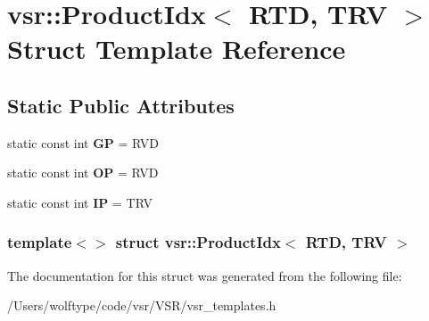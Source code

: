 \hypertarget{structvsr_1_1_product_idx_3_01_r_t_d_00_01_t_r_v_01_4}{\section{vsr\-:\-:Product\-Idx$<$ R\-T\-D, T\-R\-V $>$ Struct Template Reference}
\label{structvsr_1_1_product_idx_3_01_r_t_d_00_01_t_r_v_01_4}
}
\subsection*{Static Public Attributes}
\begin{DoxyCompactItemize}
\item 
\hypertarget{structvsr_1_1_product_idx_3_01_r_t_d_00_01_t_r_v_01_4_a17ffcf43bcd64127cebbb932d508058c}{static const int {\bfseries G\-P} = R\-V\-D}\label{structvsr_1_1_product_idx_3_01_r_t_d_00_01_t_r_v_01_4_a17ffcf43bcd64127cebbb932d508058c}

\item 
\hypertarget{structvsr_1_1_product_idx_3_01_r_t_d_00_01_t_r_v_01_4_a58b3ab06bafac482c636201db249c77d}{static const int {\bfseries O\-P} = R\-V\-D}\label{structvsr_1_1_product_idx_3_01_r_t_d_00_01_t_r_v_01_4_a58b3ab06bafac482c636201db249c77d}

\item 
\hypertarget{structvsr_1_1_product_idx_3_01_r_t_d_00_01_t_r_v_01_4_a2cc2bb2417129c5c499b96d2b22c4b17}{static const int {\bfseries I\-P} = T\-R\-V}\label{structvsr_1_1_product_idx_3_01_r_t_d_00_01_t_r_v_01_4_a2cc2bb2417129c5c499b96d2b22c4b17}

\end{DoxyCompactItemize}
\subsubsection*{template$<$$>$ struct vsr\-::\-Product\-Idx$<$ R\-T\-D, T\-R\-V $>$}



The documentation for this struct was generated from the following file\-:\begin{DoxyCompactItemize}
\item 
/\-Users/wolftype/code/vsr/\-V\-S\-R/vsr\-\_\-templates.\-h\end{DoxyCompactItemize}
